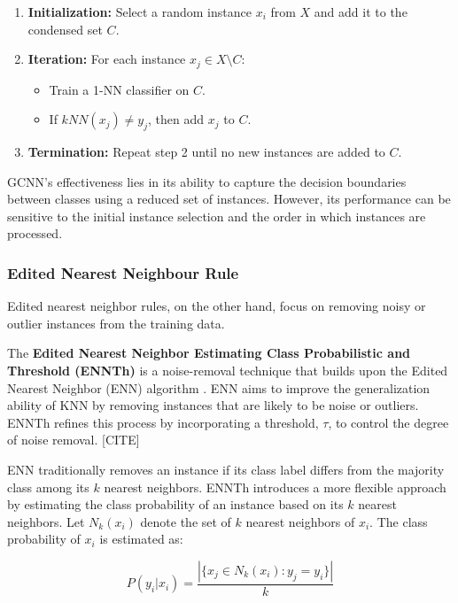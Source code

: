 \begin{enumerate}
    \item \textbf{Initialization:} Select a random instance $x_i$ from $X$ and add it to the condensed set $C$.
    \item \textbf{Iteration:} For each instance $x_j \in X \setminus C$:
    \begin{itemize}
        \item Train a 1-NN classifier on $C$.
        \item If $kNN(x_j) \neq y_j$, then add $x_j$ to $C$.
    \end{itemize}
    \item \textbf{Termination:} Repeat step 2 until no new instances are added to $C$.
\end{enumerate}

GCNN's effectiveness lies in its ability to capture the decision boundaries between classes using a reduced 
set of instances. However, its performance can be sensitive to the initial instance selection and the order 
in which instances are processed.



\subsubsection{Edited Nearest Neighbour Rule}
Edited nearest neighbor rules, on the other hand, focus on removing noisy or outlier 
instances from the training data. 

The \textbf{Edited Nearest Neighbor Estimating Class Probabilistic and Threshold (ENNTh)} is a noise-removal technique that builds upon the Edited Nearest Neighbor (ENN) algorithm \cite{wilson2000reduction}. ENN aims to improve the generalization ability of KNN by removing instances that are likely to be noise or outliers. ENNTh refines this process by incorporating a threshold, $\tau$, to control the degree of noise removal. [CITE]

ENN traditionally removes an instance if its class label differs from the majority class among its $k$ nearest neighbors. ENNTh introduces a more flexible approach by estimating the class probability of an instance based on its $k$ nearest neighbors. Let $N_k(x_i)$ denote the set of $k$ nearest neighbors of $x_i$. The class probability of $x_i$ is estimated as:

\begin{equation}
P(y_i | x_i) = \frac{|\{x_j \in N_k(x_i) : y_j = y_i\}|}{k}
\end{equation}


